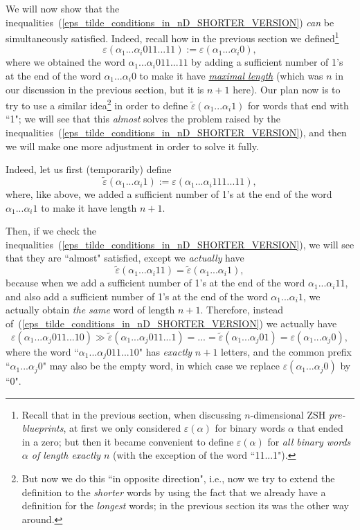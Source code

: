 \documentclass[12pt,letterpaper]{article}
\newcommand{\eps}{\varepsilon}
\newcommand{\et}{\tilde\eps}
\renewcommand{\a}{\alpha}
\begin{document}
We will now show that the inequalities~(\ref{eps_tilde_conditions_in_nD_SHORTER_VERSION}) {\em can} be simultaneously satisfied. Indeed, recall how in the previous section we defined\footnote{Recall that  in the previous section, when discussing $n$-dimensional ZSH {\em pre-blueprints}, at first we only considered $\eps(\a)$ for binary  words $\a$ that ended in a zero; but then it became convenient to define $\eps(\a)$ for {\em all binary  words $\a$ of length exactly $n$} (with the exception of the word ``11...1").}
$$
\eps(\a_1...\a_i 0 11...11) := \eps(\a_1...\a_i 0),
$$
where we obtained the word $\a_1...\a_i 0 11...11$ by adding a sufficient number of 1's at the end of the word $\a_1...\a_i 0$ to make it have \ul{\em maximal length} (which was $n$ in our discussion in the previous section, but it is $n+1$ here).
Our plan now is to try to use a similar idea\footnote{But now we do this ``in opposite direction", i.e., now we try to extend the definition to the {\em shorter} words by using the fact that we already have a definition for the {\em longest} words; in the previous section its was the other way around.} in order to define $\et(\a_1...\a_i 1)$ for words that end with ``1"; we will see that this {\em almost} 
\hskip0.06cm 
solves the problem raised by the inequalities~(\ref{eps_tilde_conditions_in_nD_SHORTER_VERSION}), and then we will make one more adjustment in order  to solve it fully. 


\noindent
Indeed, let us first (temporarily) define 
$$
\et(\a_1...\a_i 1) := \eps(\a_1...\a_i 1 11...11), 
$$
where, like above,  we added a sufficient number of 1's at the end of the word $\a_1...\a_i 1$ to make it have length $n+1$.

Then, if we check the inequalities~(\ref{eps_tilde_conditions_in_nD_SHORTER_VERSION}), we will see that they are  ``almost" satisfied, except we {\em actually} have  
$$
\et(\a_1...\a_i 11) = \et(\a_1...\a_i 1),
$$ 
because when we add a sufficient number of 1's at the end of the word $\a_1...\a_i 11$, and also add a sufficient number of 1's at the end of the word $\a_1...\a_i 1$, we actually obtain {\em the same} word of length $n+1$. 
Therefore, instead of~(\ref{eps_tilde_conditions_in_nD_SHORTER_VERSION}) we actually have  
$$
\eps(\a_1...\a_j 011...10) \gg \et(\a_1...\a_j 011...1)  =  ...  =   \et(\a_1...\a_j 01) = \eps(\a_1...\a_j 0),
$$
where the  word ``$\a_1...\a_j 011...10$" has {\em exactly} $n+1$ letters, and the common prefix ``$\a_1...\a_j 0$" may also be the empty word, in which case we replace $\eps(\a_1...\a_j 0)$ by ``0".
\end{document}

